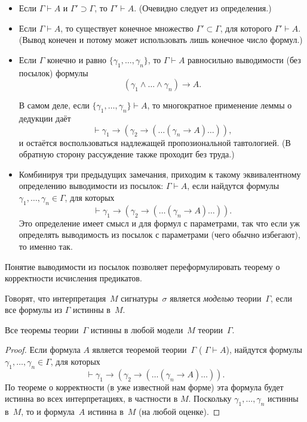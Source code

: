 \begin{itemize}
        \item
Если $\Gamma\vdash A$ и $\Gamma' \supset \Gamma$, то $\Gamma' \vdash A$.
(Очевидно следует из определения.)
        \item
Если $\Gamma\vdash A$, то существует конечное множество $\Gamma'
\subset \Gamma$, для которого $\Gamma' \vdash A$. (Вывод конечен
и потому может использовать лишь конечное число формул.)
        \item
Если $\Gamma$ конечно и равно
$\{\gamma_1,\dots,\gamma_n\}$, то $\Gamma\vdash A$ равносильно
выводимости (без посылок)
формулы
     $$(\gamma_1\land\ldots\land\gamma_n)\to A.$$

В самом деле, если $\{\gamma_1,\dots,\gamma_n\}\vdash A$, то
многократное применение леммы о дедукции даёт
        $$
\vdash \gamma_1\to(\gamma_2\to(\ldots(\gamma_n\to A)\ldots)),
        $$
и остаётся воспользоваться надлежащей пропозиональной
тавтологией. (В обратную сторону рассуждение также проходит без
труда.)

        \item
Комбинируя три предыдущих замечания, приходим к такому
эквивалентному определению выводимости из посылок: $\Gamma\vdash A$,
если найдутся формулы $\gamma_1,\dots,\gamma_n\in \Gamma$, для которых
        $$
\vdash \gamma_1\to(\gamma_2\to(\ldots(\gamma_n\to A)\ldots)).
        $$
Это определение имеет смысл и для формул с параметрами, так что если уж
определять выводимость из посылок с параметрами (чего обычно избегают),
то именно так.
\end{itemize}

Понятие выводимости из посылок позволяет переформулировать
теорему о корректности%
%
исчисления предикатов.

Говорят, что интерпретация~$M$ сигнатуры~$\sigma$ является
\emph{моделью} теории~$\Gamma$, если
все формулы из $\Gamma$ истинны в~$M$.

\begin{theorem}
%
  \label{correctness-reformulation}%
Все теоремы теории~$\Gamma$ истинны в любой модели~$M$
теории~$\Gamma$.
\end{theorem}

\begin{proof}
Если формула $A$ является теоремой теории~$\Gamma$ (
$\Gamma\vdash A$), найдутся формулы
$\gamma_1,\dots,\gamma_n\in\Gamma$, для которых
        $$
\vdash \gamma_1\to(\gamma_2\to(\ldots(\gamma_n\to A)\ldots)).
        $$
По теореме о корректности (в уже известной нам форме) эта
формула будет истинна во всех интерпретациях, в частности в $M$.
Поскольку $\gamma_1,\dots,\gamma_n$ истинны в~$M$, то и
формула~$A$ истинна в~$M$ (на любой оценке).
\end{proof}

